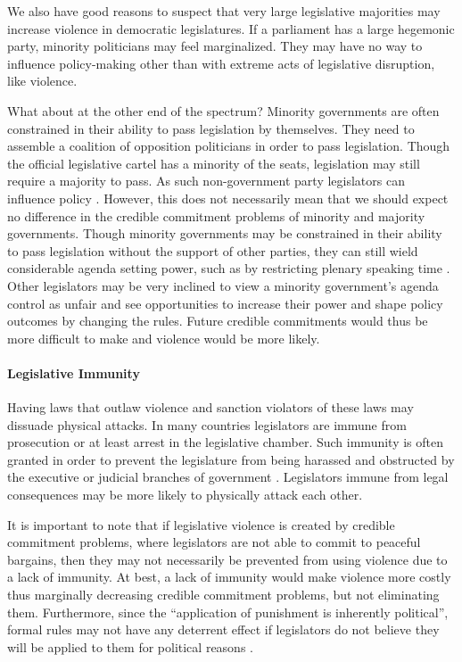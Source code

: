 \documentclass[a4paper]{article}\usepackage[]{graphicx}\usepackage[]{color}
\begin{document}
We also have good reasons to suspect that very large legislative majorities may increase violence in democratic legislatures. If a parliament has a large hegemonic party, minority politicians may feel marginalized. They may have no way to influence policy-making other than with extreme acts of legislative disruption, like violence.

What about at the other end of the spectrum? Minority governments are often constrained in their ability to pass legislation by themselves. They need to assemble a coalition of opposition politicians in order to pass legislation. Though the official legislative cartel has a minority of the seats, legislation may still require a majority to pass. As such non-government party legislators can influence policy \citep{strom1990minority}. However, this does not necessarily mean that we should expect no difference in the credible commitment problems of minority and majority governments. Though minority governments may be constrained in their ability to pass legislation without the support of other parties, they can still wield considerable agenda setting power, such as by restricting plenary speaking time \citep{tsebelis2002,cox2005,cox2007}. Other legislators may be very inclined to view a minority government's agenda control as unfair and see opportunities to increase their power and shape policy outcomes by changing the rules. Future credible commitments would thus be more difficult to make and violence would be more likely.

\paragraph{Legislative Immunity}

Having laws that outlaw violence and sanction violators of these laws may dissuade physical attacks. In many countries legislators are immune from prosecution or at least arrest in the legislative chamber. Such immunity is often granted in order to prevent the legislature from being harassed and obstructed by the executive or judicial branches of government \citep{Seghetti1984}. Legislators immune from legal consequences may be more likely to physically attack each other.

It is important to note that if legislative violence is created by credible commitment problems, where legislators are not able to commit to peaceful bargains, then they may not necessarily be prevented from using violence due to a lack of immunity. At best, a lack of immunity would make violence more costly thus marginally decreasing credible commitment problems, but not eliminating them. Furthermore, since the ``application of punishment is inherently political'', formal rules may not have any deterrent effect if legislators do not believe they will be applied to them for political reasons \cite[58]{Wolfe2004}.
\end{document}
